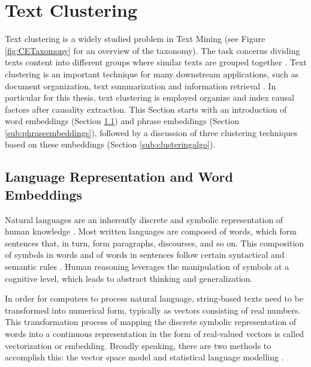 


\section{Text Clustering} \label{sec:clustering}


Text clustering is a widely studied problem in Text Mining (see Figure \ref{fig:CETaxomony} for an overview of the taxonomy). The task concerns dividing texts content into different groups where similar texts are grouped together \cite{Aggarwal2012}. Text clustering is an important technique for many downstream applications, such as document organization, text summarization and information retrieval \cite{surveyDocClustering2015, surveyTextMining2017}. In particular for this thesis, text clustering is employed organize and index causal factors after causality extraction. This Section starts with an introduction of word embeddings (Section \ref{sub:wordembeddings}) and phrase embeddings (Section \ref{sub:phraseembeddings}), followed by a discussion of three clustering techniques based on these embeddings (Section \ref{sub:clusteringalgo}).

\subsection{Language Representation and Word Embeddings}\label{sub:wordembeddings}

Natural languages are an inherently discrete and symbolic representation of human knowledge \cite{Ferrone20Survey}. Most written languages are composed of words, which form sentences that, in turn, form paragraphs, discourses, and so on. This composition of symbols in words and of words in sentences follow certain syntactical and semantic rules \cite{Cartuyvels21Survey}. Human reasoning leverages the manipulation of symbols at a cognitive level, which leads to abstract thinking and generalization.

In order for computers to process natural language, string-based texts need to be transformed into numerical form, typically as vectors consisting of real numbers. This transformation process of mapping the discrete symbolic representation of words into a continuous representation in the form of real-valued vectors is called vectorization or embedding. Broadly speaking, there are two methods to accomplish this: the vector space model and statistical language modelling \cite{WordEmbSurvey19}.

